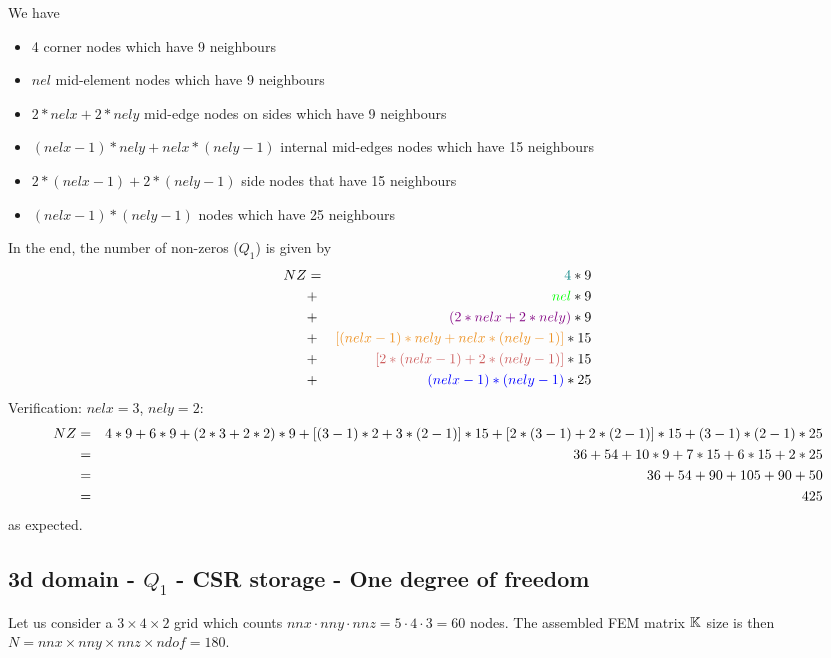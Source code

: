 We have
\begin{itemize}
\item {\color{teal} 4} corner nodes which have 9 neighbours
\item {\color{green} $nel$} mid-element nodes which have 9 neighbours
\item {\color{violet} $2*nelx+2*nely$} mid-edge nodes on sides which have 9 neighbours
\item {\color{carrotorange} $(nelx-1)*nely+nelx*(nely-1)$} internal mid-edges nodes which have 15 neighbours
\item {\color{chestnut} $2*(nelx-1)+2*(nely-1)$} side nodes that have 15 neighbours 
\item {\color{blue} $(nelx-1)*(nely-1)$} nodes which have 25 neighbours
\end{itemize}
In the end, the number of non-zeros ($Q_1$) is given by
\begin{eqnarray}
NZ 
&=& {\color{teal} 4 }*9 \nn\\
&+& {\color{green} nel }*9 \nn\\
&+& {\color{violet} (2*nelx+2*nely) }*9 \nn\\
&+& {\color{carrotorange} [(nelx-1)*nely+nelx*(nely-1)] }*15 \nn\\
&+& {\color{chestnut} [2*(nelx-1)+2*(nely-1)] }*15 \nn\\
&+& {\color{blue} (nelx-1)*(nely-1) }*25 \nn
\end{eqnarray}
Verification: $nelx=3$, $nely=2$:
\begin{eqnarray}
NZ
&=& 4*9 + 6*9 + (2*3+2*2)*9 + [(3-1)*2+3*(2-1)]*15
+ [2*(3-1)+2*(2-1)]*15 + (3-1)*(2-1)*25 \nonumber\\
&=& 36 + 54 + 10*9 + 7*15 + 6*15 + 2*25 \nonumber\\
&=& 36 + 54 + 90 + 105 + 90 + 50  \nonumber\\
&=& 425 \nonumber
\end{eqnarray}
as expected.








\subsection{3d domain - $Q_1$ - CSR storage - One degree of freedom}

Let us consider a $3\times4\times2$ grid which counts 
$nnx\cdot nny \cdot nnz = 5 \cdot 4\cdot 3=60$ nodes.
The assembled FEM matrix ${\mathbb{K}}$ size is then 
$N=nnx\times nny\times nnz \times ndof=180$.

